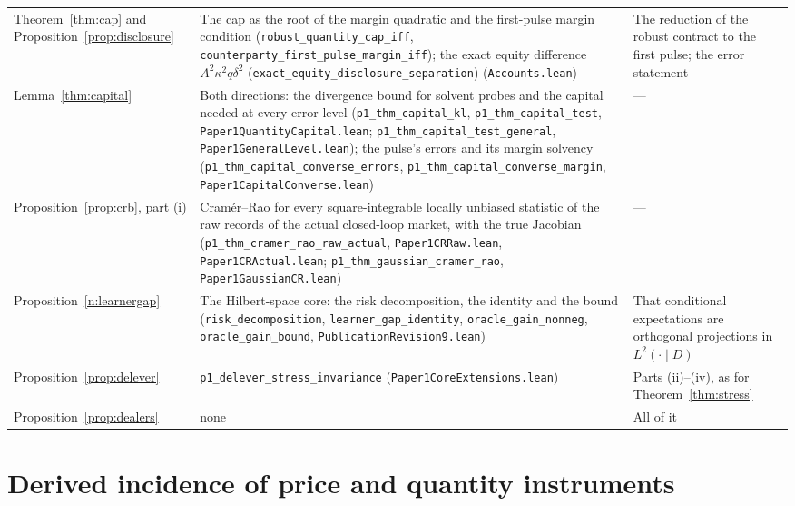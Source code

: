 \documentclass[12pt]{article}
\theoremstyle{definition}
\theoremstyle{remark}
\begin{document}
\begin{longtable}{>{\raggedright\arraybackslash}p{}>{\raggedright\arraybackslash}p{}>{\raggedright\arraybackslash}p{}}
Theorem~\ref{thm:cap} and Proposition~\ref{prop:disclosure} & The cap as the root of the margin quadratic and the first-pulse margin condition (\texttt{robust\_quantity\_cap\_iff}, \nolinkurl{counterparty_first_pulse_margin_iff}); the exact equity difference $A^2\kappa^2q\delta^2$ (\nolinkurl{exact_equity_disclosure_separation}) (\nolinkurl{Accounts.lean}) & The reduction of the robust contract to the first pulse; the error statement\\
Lemma~\ref{thm:capital} & Both directions: the divergence bound for solvent probes and the capital needed at every error level (\texttt{p1\_thm\_capital\_kl}, \texttt{p1\_thm\_capital\_test}, \nolinkurl{Paper1QuantityCapital.lean}; \nolinkurl{p1_thm_capital_test_general}, \nolinkurl{Paper1GeneralLevel.lean}); the pulse's errors and its margin solvency (\nolinkurl{p1_thm_capital_converse_errors}, \nolinkurl{p1_thm_capital_converse_margin}, \nolinkurl{Paper1CapitalConverse.lean}) & ---\\
Proposition~\ref{prop:crb}, part (i) & Cram\'er--Rao for every square-integrable locally unbiased statistic of the raw records of the actual closed-loop market, with the true Jacobian (\nolinkurl{p1_thm_cramer_rao_raw_actual}, \nolinkurl{Paper1CRRaw.lean}, \nolinkurl{Paper1CRActual.lean}; \nolinkurl{p1_thm_gaussian_cramer_rao}, \nolinkurl{Paper1GaussianCR.lean}) & ---\\
Proposition~\ref{n:learnergap} & The Hilbert-space core: the risk decomposition, the identity and the bound (\texttt{risk\_decomposition}, \texttt{learner\_gap\_identity}, \texttt{oracle\_gain\_nonneg}, \texttt{oracle\_gain\_bound}, \nolinkurl{PublicationRevision9.lean}) & That conditional expectations are orthogonal projections in $L^2(\cdot\mid D)$\\
Proposition~\ref{prop:delever} & \texttt{p1\_delever\_stress\_invariance} (\nolinkurl{Paper1CoreExtensions.lean}) & Parts (ii)--(iv), as for Theorem~\ref{thm:stress}\\
Proposition~\ref{prop:dealers} & none & All of it\\
\bottomrule
\end{longtable}


\section{Derived incidence of price and quantity instruments}\label{app:instruments}
\end{document}
